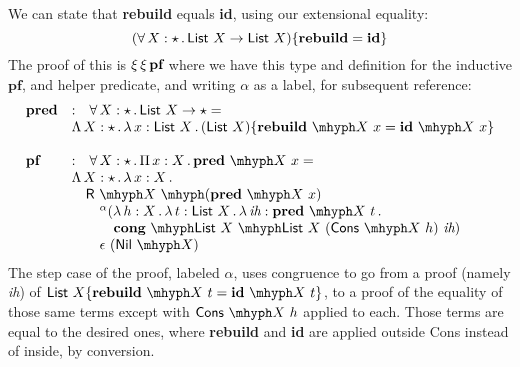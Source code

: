 \documentclass{article}
\begin{document}
We can state that \textbf{rebuild} equals
\textbf{id}, using our extensional equality:
\[
\eqtm{\textbf{rebuild}}{(\allt{X}{\star}{\mathsf{List}\ X \to \mathsf{List}\ X})}{\textbf{id}}
\]
\noindent The proof of this is $\xi\, \xi\, \textbf{pf}$ where we have
this type and definition for the inductive $\textbf{pf}$, and helper
predicate, and writing $\alpha$ as a label, for subsequent reference:
\[
\begin{array}{lll}
  \textbf{pred} & : & \allt{X}{\star}{\mathsf{List}\ X \to \star} = \\
  \ & \multicolumn{2}{l}{\Tlam{X}{\star}{\tlam{x}{\mathsf{List}\ X}{\eqtm{\appe{\textbf{rebuild}}{X}\ x}{(\mathsf{List}\ X)}{\appe{\textbf{id}}{X}\ x}}}} \\ \\ 
  \textbf{pf} & : & \allt{X}{\star}{\Pia{x}{X}{\appe{\textbf{pred}}{X}\ x}} = \\
  \ & \multicolumn{2}{l}{\Tlam{X}{\star}{\tlam{x}{X}{\ }}} \\
  \ & \multicolumn{2}{l}{\ \ \ \appe{\appe{\mathsf{R}}{X}}{(\appe{\textbf{pred}}{X}\ x)}} \\
  \ & \multicolumn{2}{l}{\ \ \ \ \ {\ }^\alpha(\tlam{h}{X}{\tlam{t}{\mathsf{List}\ X}}{\tlam{\textit{ih}}{\appe{\textbf{pred}}{X}\ t}}} \\
  \ & \multicolumn{2}{l}{\ \ \ \ \ \ \ \ \ \appe{\appe{\textbf{cong}}{\mathsf{List}\ X}}{\mathsf{List}\ X}\ (\appe{\mathsf{Cons}}{X}\ h)\ \textit{ih})} \\
  \ & \multicolumn{2}{l}{\ \ \ \ \ \ \rfl{(\appe{\mathsf{Nil}}{X})}}
  \end{array}
\]
    \noindent The step case of the proof, labeled $\alpha$, uses
    congruence to go from a proof (namely \textit{ih}) of
    $\eqtm{\appe{\mathbf{rebuild}}{X}\ t}{\mathsf{List}\ X}{\appe{\mathbf{id}}{X}\ t}$,
    to a proof of the equality of those same terms except with
    $\appe{\mathsf{Cons}}{X}\ h$ applied to each.  Those terms are
    equal to the desired ones, where \textbf{rebuild} and \textbf{id}
    are applied outside \textsf{Cons} instead of inside, by
    conversion.


 
\end{document}
